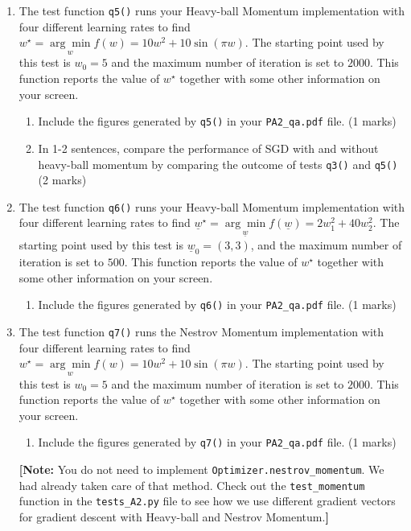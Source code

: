 \documentclass{article}
\theoremstyle{definition}
\begin{document}
\begin{enumerate}[label=\ref{mom}.\alph*]
	\item \label{ddd}The test function \verb|q5()| runs your Heavy-ball Momentum implementation with four different learning rates to find $w^\star = \underset{w}{\arg \min} f(w) = 10w^2 + 10\sin(\pi w)$. The starting point used by this test is $w_0=5$ and the maximum number of iteration is set to $2000$. This function reports the value of $w^\star$ together with some other information on your screen.
	\begin{enumerate}[label=\ref{ddd}.\roman*]
		\item Include the figures generated by \verb|q5()| in your \verb|PA2_qa.pdf| file. (1 marks)
		\item In 1-2 sentences, compare the performance of SGD with and without heavy-ball momentum by comparing the outcome of tests \verb|q3()| and \verb|q5()| (2 marks)
	\end{enumerate}
	\item \label{fff}The test function \verb|q6()| runs your Heavy-ball Momentum implementation with four different learning rates to find $\underline{w}^\star = \underset{\underline{w}}{\arg \min} f(\underline{w}) = 2 w_1^2 + 40w_2^2$. The starting point used by this test is $\underline{w}_0=(3,3)$, and the maximum number of iteration is set to $500$. This function reports the value of $w^\star$ together with some other information on your screen.
	\begin{enumerate}[label=\ref{fff}.\roman*]
		\item Include the figures generated by \verb|q6()| in your \verb|PA2_qa.pdf| file. (1 marks)
	\end{enumerate}
	\item \label{ggg}The test function \verb|q7()| runs the Nestrov Momentum implementation with four different learning rates to find $w^\star = \underset{w}{\arg \min} f(w) = 10w^2 + 10\sin(\pi w)$. The starting point used by this test is $w_0=5$ and the maximum number of iteration is set to $2000$. This function reports the value of $w^\star$ together with some other information on your screen.
	\begin{enumerate}[label=\ref{ggg}.\roman*]
		\item Include the figures generated by \verb|q7()| in your \verb|PA2_qa.pdf| file. (1 marks)
	\end{enumerate}
	\textbf{[Note:} You do not need to implement \verb|Optimizer.nestrov_momentum|. We had already taken care of that method. Check out the \verb|test_momentum| function in the \verb|tests_A2.py| file to see how we use different gradient vectors for gradient descent with Heavy-ball and Nestrov Momentum.\textbf{]}

\end{enumerate}
\end{document}
